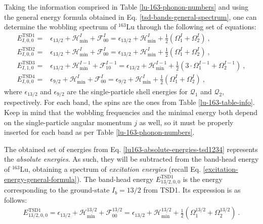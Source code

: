 Taking the information comprised in Table \ref{lu-163-phonon-numbers} and using the general energy formula obtained in Eq. \ref{tsd-bands-general-spectrum}, one can determine the wobbling spectrum of $^{163}$Lu through the following set of equations:
\begin{align}
    E_{I,0,0}^\text{TSD1}=&\epsilon_{13/2}+\mathcal{H}_\text{min}^I+\mathcal{F}_{00}^I=\epsilon_{13/2}+\mathcal{H}_\text{min}^I+\frac{1}{2}\left(\Omega_1^I+\Omega_2^I\right)\ ,\nonumber\\
    E_{I,0,0}^\text{TSD2}=&\epsilon_{13/2}+\mathcal{H}_\text{min}^I+\mathcal{F}_{00}^I=\epsilon_{13/2}+\mathcal{H}_\text{min}^I+\frac{1}{2}\left(\Omega_1^I+\Omega_2^I\right)\ ,\nonumber\\
    E_{I,1,0}^\text{TSD3}=&\epsilon_{13/2}+\mathcal{H}_\text{min}^{I-1}+\mathcal{F}_{10}^{I-1}=\epsilon_{13/2}+\mathcal{H}_\text{min}^{I-1}+\frac{1}{2}\left(3\cdot\Omega_1^{I-1}+\Omega_2^{I-1}\right)\ ,\nonumber\\
    E_{I,0,0}^\text{TSD4}=&\epsilon_{9/2}+\mathcal{H}_\text{min}^{I}+\mathcal{F}_{00}^{I}=\epsilon_{9/2}+\mathcal{H}_\text{min}^{I}+\frac{1}{2}\left(\Omega_1^{I}+\Omega_2^{I}\right)\ ,
    \label{lu163-absolute-energies-tsd1234}
\end{align}
where $\epsilon_{13/2}$ and $\epsilon_{9/2}$ are the single-particle shell energies for $\mathcal{Q}_1$ and $\mathcal{Q}_2$, respectively. For each band, the spins are the ones from Table \ref{lu-163-table-info}. Keep in mind that the wobbling frequencies and the minimal energy both depend on the single-particle angular momentum $j$ as well, so it must be properly inserted for each band as per Table \ref{lu-163-phonon-numbers}. 

The obtained set of energies from Eq. \ref{lu163-absolute-energies-tsd1234} represents the \emph{absolute energies}. As such, they will be subtracted from the band-head energy of $^{163}$Lu, obtaining a spectrum of \emph{excitation energies} (recall Eq. \ref{excitation-energy-general-formula}). The band-head energy $E_{13/2,0,0}^\text{TSD1}$ is the energy corresponding to the ground-state $I_b=13/2$ from TSD1. Its expression is as follows:
\begin{align}
    E_{13/2,0,0}^\text{TSD1}=\epsilon_{13/2}+\mathcal{H}_\text{min}^{13/2}+\mathcal{F}_{00}^{13/2}=\epsilon_{13/2}+\mathcal{H}_\text{min}^{13/2}+\frac{1}{2}\left(\Omega_1^{13/2}+\Omega_2^{13/2}\right)\ .
    \label{lu163-absolute-energy-band-head}
\end{align}

